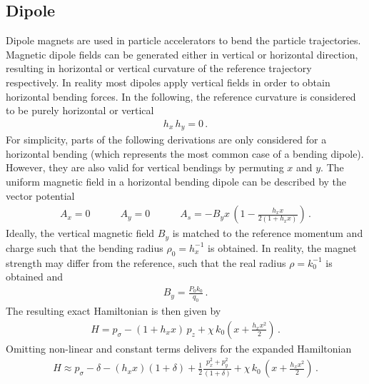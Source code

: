 \subsection{Dipole}
Dipole magnets are used in particle accelerators to bend the particle trajectories. Magnetic dipole fields can be generated either in vertical or horizontal direction, resulting in horizontal or vertical curvature of the reference trajectory respectively. In reality most dipoles apply vertical fields in order to obtain horizontal bending forces. In the following, the reference curvature is considered to be purely horizontal or vertical 
\begin{align}
h_x \, h_y =0 \, . \label{eq:hovebending}
\end{align}
For simplicity, parts of the following derivations are only considered for a horizontal bending (which represents the most common case of a bending dipole). However, they are also valid for vertical bendings by permuting $x$ and $y$. The uniform magnetic field in a horizontal bending dipole can be described by the vector potential~\cite{}
\begin{align}
A_x = 0 \quad \quad \quad A_y =0 \quad \quad \quad A_s = -B_y x \, \left( 1- \frac{h_x x}{2 (1+h_x x)} \right)\, .
\end{align}
Ideally, the vertical magnetic field $B_y$ is matched to the reference momentum and charge such that the bending radius $\rho_0=h_x^{-1}$ is obtained. In reality, the magnet strength may differ from the reference, such that the real radius $\rho=k_0^{-1}$ is obtained and
\begin{align}
B_y = \frac{P_0 k_0}{q_0} \,  .
\end{align}
The resulting exact Hamiltonian is then given by
\begin{align}
H = p_\sigma - (1+h_x x)\, p_z + \chi \, k_0 \left( x + \frac{h_x x^2}{2} \right) \, .
\end{align}
Omitting non-linear and constant terms delivers for the expanded Hamiltonian 
\begin{align}
H \approx p_\sigma - \delta - (h_x x) (1+\delta) + \frac{1}{2} \frac{p_x^2 + p_y^2}{(1+\delta)} + \chi \, k_0 \, \left(x + \frac{h_x x^2}{2}\right) \, .
\end{align}


